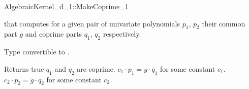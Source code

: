 \begin{ccRefConcept}{AlgebraicKernel_d_1::MakeCoprime_1}

\ccDefinition

 that computes for a given pair of 
univariate polynomials $p_1$, $p_2$ their common part $g$ and 
coprime parts $q_1$, $q_2$ respectively.



        { Type convertible to .}
 

{ Returns true $q_1$ and $q_2$ are coprime. 
\ccPostcond $c_1 \cdot p_1 =  g \cdot q_1$ for some constant $c_1$.
\ccPostcond $c_2 \cdot p_2 =  g \cdot q_2$ for some constant $c_2$.
}

\ccSeeAlso

\end{ccRefConcept}
